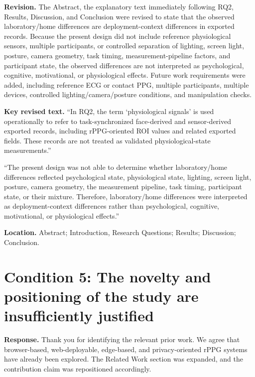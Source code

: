 \documentclass[11pt]{article}
\newcommand{\condition}[2]{\section*{Condition #1: #2}}
\begin{document}
\textbf{Revision.}
The Abstract, the explanatory text immediately following RQ2, Results, Discussion, and Conclusion were revised to state that the observed laboratory/home differences are deployment-context differences in exported records.
Because the present design did not include reference physiological sensors, multiple participants, or controlled separation of lighting, screen light, posture, camera geometry, task timing, measurement-pipeline factors, and participant state, the observed differences are not interpreted as psychological, cognitive, motivational, or physiological effects.
Future work requirements were added, including reference ECG or contact PPG, multiple participants, multiple devices, controlled lighting/camera/posture conditions, and manipulation checks.

\textbf{Key revised text.}
``In RQ2, the term `physiological signals' is used operationally to refer to task-synchronized face-derived and sensor-derived exported records, including rPPG-oriented ROI values and related exported fields. These records are not treated as validated physiological-state measurements.''

``The present design was not able to determine whether laboratory/home differences reflected psychological state, physiological state, lighting, screen light, posture, camera geometry, the measurement pipeline, task timing, participant state, or their mixture. Therefore, laboratory/home differences were interpreted as deployment-context differences rather than psychological, cognitive, motivational, or physiological effects.''

\textbf{Location.}
Abstract; Introduction, Research Questions; Results; Discussion; Conclusion.

\condition{5}{The novelty and positioning of the study are insufficiently justified}
\textbf{Response.}
Thank you for identifying the relevant prior work.
We agree that browser-based, web-deployable, edge-based, and privacy-oriented rPPG systems have already been explored.
The Related Work section was expanded, and the contribution claim was repositioned accordingly.
\end{document}
